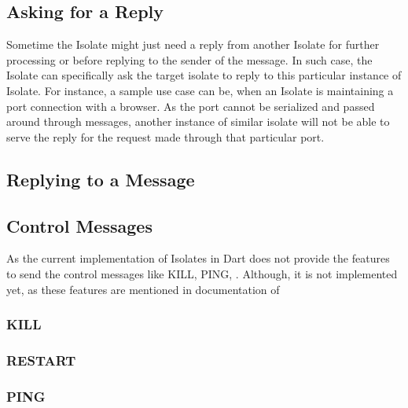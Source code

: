 \subsection{Asking for a Reply}
Sometime the Isolate might just need a reply from another Isolate for further processing or before replying to the sender of the message. In such case, the Isolate can specifically ask the target isolate to reply to this particular instance of Isolate.
For instance, a sample use case can be, when an Isolate is maintaining a port connection with a browser. As the port cannot be serialized and passed around through messages, another instance of similar isolate will not be able to serve the reply for the request made through that particular port.

\subsection{Replying to a Message}

\subsection{Control Messages}
As the current implementation of Isolates in Dart does not provide the features to send the control messages like KILL, PING, . Although, it is not implemented yet, as these features are mentioned in documentation of
\subsubsection{KILL}
\subsubsection{RESTART}
\subsubsection{PING}

